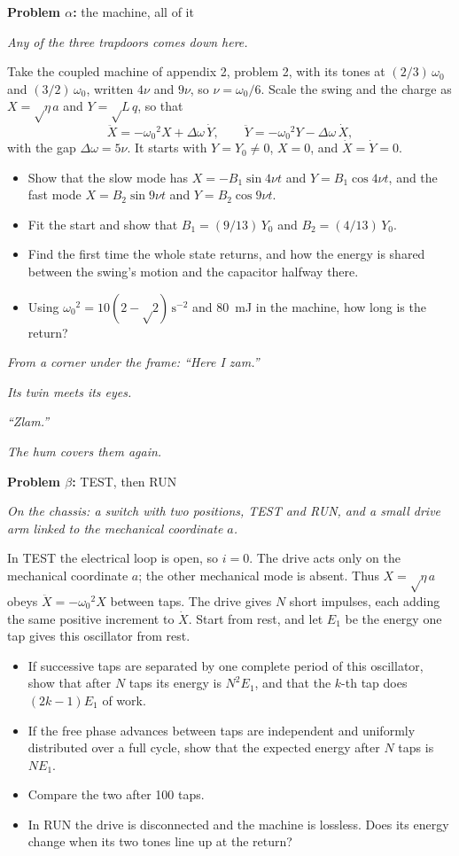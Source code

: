 \documentclass[11pt]{article}
\newcommand{\scene}[1]{\par{\itshape #1}\par}
\newcommand{\problem}[2]{\par\medskip\textbf{Problem #1:} #2\par\nopagebreak}
\newenvironment{parts}{\begin{itemize}[leftmargin=3.4em,labelwidth=2.8em,labelsep=0.6em,align=left,itemsep=2pt,topsep=3pt]}{\end{itemize}}
\newcommand{\pt}[1]{\item[\textbf{#1}]}
\newcommand{\rt}{\text{√}}  %
\begin{document}
\problem{$\alpha$}{the machine, all of it}
\scene{Any of the three trapdoors comes down here.}
Take the coupled machine of appendix 2, problem 2, with its tones at $(2/3)\,\omega_0$ and $(3/2)\,\omega_0$, written $4\nu$ and $9\nu$, so $\nu = \omega_0/6$. Scale the swing and the charge as $X = \rt\eta\,a$ and $Y = \rt L\,q$, so that
\[ \ddot X = -\omega_0{}^2X + \Delta\omega\,\dot Y, \qquad \ddot Y = -\omega_0{}^2Y - \Delta\omega\,\dot X, \]
with the gap $\Delta\omega = 5\nu$. It starts with $Y = Y_0 \ne 0$, $X = 0$, and $\dot X = \dot Y = 0$.
\begin{parts}
\pt{$\alpha$-1} Show that the slow mode has $X = -B_1\sin 4\nu t$ and $Y = B_1\cos 4\nu t$, and the fast mode $X = B_2\sin 9\nu t$ and $Y = B_2\cos 9\nu t$.
\pt{$\alpha$-2} Fit the start and show that $B_1 = (9/13)\,Y_0$ and $B_2 = (4/13)\,Y_0$.
\pt{$\alpha$-3} Find the first time the whole state returns, and how the energy is shared between the swing's motion and the capacitor halfway there.
\pt{$\alpha$-4} Using $\omega_0{}^2 = 10(2 - \rt2)\,\mathrm{s^{-2}}$ and \SI{80}{mJ} in the machine, how long is the return?
\end{parts}
\scene{From a corner under the frame: ``Here I zam.''}
\scene{Its twin meets its eyes.}
\scene{``Zlam.''}
\scene{The hum covers them again.}

\problem{$\beta$}{TEST, then RUN}
\scene{On the chassis: a switch with two positions, TEST and RUN, and a small drive arm linked to the mechanical coordinate $a$.}
In TEST the electrical loop is open, so $i = 0$. The drive acts only on the mechanical coordinate $a$; the other mechanical mode is absent. Thus $X = \rt\eta\,a$ obeys $\ddot X = -\omega_0{}^2X$ between taps. The drive gives $N$ short impulses, each adding the same positive increment to $\dot X$. Start from rest, and let $E_1$ be the energy one tap gives this oscillator from rest.
\begin{parts}
\pt{$\beta$-1} If successive taps are separated by one complete period of this oscillator, show that after $N$ taps its energy is $N^2E_1$, and that the $k$-th tap does $(2k - 1)E_1$ of work.
\pt{$\beta$-2} If the free phase advances between taps are independent and uniformly distributed over a full cycle, show that the expected energy after $N$ taps is $NE_1$.
\pt{$\beta$-3} Compare the two after 100 taps.
\pt{$\beta$-4} In RUN the drive is disconnected and the machine is lossless. Does its energy change when its two tones line up at the return?
\end{parts}
\end{document}
